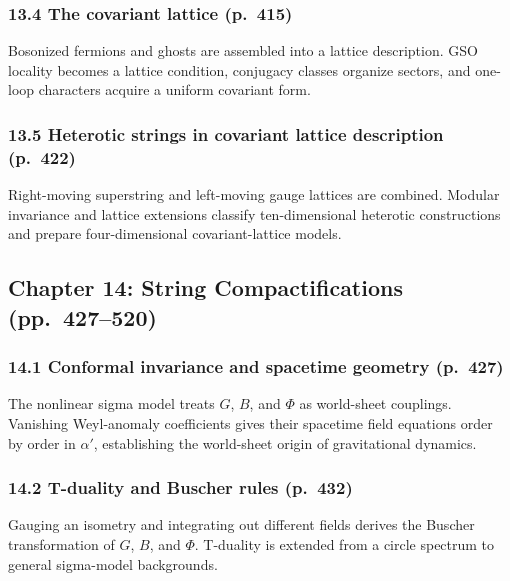 \documentclass[
  10pt,
  a4paper,
  openany]{book}
\begin{document}
\subsubsection{13.4 The covariant lattice
(p.~415)}\label{the-covariant-lattice-p.-415}

Bosonized fermions and ghosts are assembled into a lattice description.
GSO locality becomes a lattice condition, conjugacy classes organize
sectors, and one-loop characters acquire a uniform covariant form.

\subsubsection{13.5 Heterotic strings in covariant lattice description
(p.~422)}\label{heterotic-strings-in-covariant-lattice-description-p.-422}

Right-moving superstring and left-moving gauge lattices are combined.
Modular invariance and lattice extensions classify ten-dimensional
heterotic constructions and prepare four-dimensional covariant-lattice
models.

\subsection{Chapter 14: String Compactifications
(pp.~427--520)}\label{chapter-14-string-compactifications-pp.-427520}

\subsubsection{14.1 Conformal invariance and spacetime geometry
(p.~427)}\label{conformal-invariance-and-spacetime-geometry-p.-427}

The nonlinear sigma model treats \(G\), \(B\), and \(\Phi\) as
world-sheet couplings. Vanishing Weyl-anomaly coefficients gives their
spacetime field equations order by order in \(\alpha'\), establishing
the world-sheet origin of gravitational dynamics.

\subsubsection{14.2 T-duality and Buscher rules
(p.~432)}\label{t-duality-and-buscher-rules-p.-432}

Gauging an isometry and integrating out different fields derives the
Buscher transformation of \(G\), \(B\), and \(\Phi\). T-duality is
extended from a circle spectrum to general sigma-model backgrounds.
\end{document}
